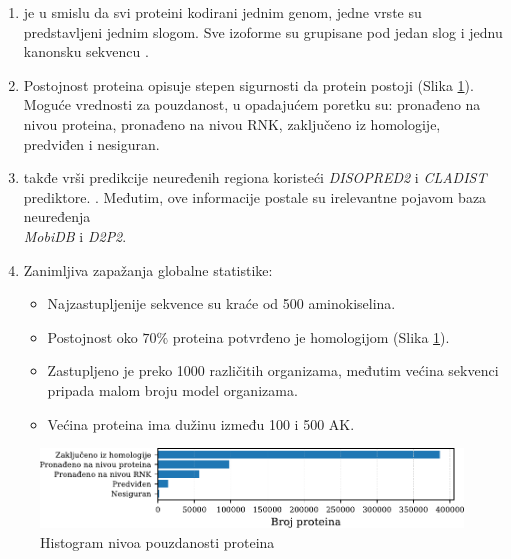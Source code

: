 \begin{enumerate}
  \item
    \label{red}
    \swissprot je  u smislu da svi proteini
    kodirani jednim genom, jedne vrste su predstavljeni jednim slogom. Sve
    izoforme su grupisane pod jedan slog i jednu kanonsku sekvencu \parencite{nonRedundant}.

  \item Postojnost proteina   opisuje stepen
    sigurnosti da protein postoji (Slika \ref{fig:PE}). Moguće vrednosti za pouzdanost, u opadajućem poretku su:
    pronađeno na nivou proteina, pronađeno na nivou RNK, zaključeno iz homologije, predviđen i nesiguran. 

  \clearpage


  \item
    \swissprot takđe vrši predikcije neuređenih regiona koristeći \textit{DISOPRED2}
    i \textit{CLADIST} prediktore. \parencite{Meng_c2017}. Međutim, ove informacije
    postale su irelevantne pojavom baza neuređenja \\ \textit{MobiDB}\parencite{Piovesan2017} i \textit{D2P2}\parencite{Oates2012}.

  \item Zanimljiva zapažanja globalne statistike:
    \begin{itemize}
      \item Najzastupljenije sekvence su kraće od 500 aminokiselina.
      \item Postojnost oko $70\%$ proteina potvrđeno je homologijom (Slika \ref{fig:PE}).
      \item Zastupljeno je preko 1000 različitih organizama, međutim
        većina \swissprot sekvenci pripada malom broju model organizama.
      \item Većina proteina ima dužinu između 100 i 500 AK.
    \end{itemize}
      


\end{enumerate}

\begin{figure}[h!]
  \centering
  \hspace*{-1cm} 
  \includegraphics[]{plots/PE.pdf}
  \caption{Histogram nivoa pouzdanosti \swissprot proteina}
  \label{fig:PE}
\end{figure}

%
%
%













